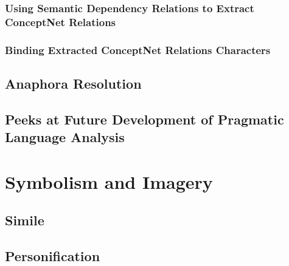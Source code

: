\subsubsection{Using Semantic Dependency Relations to Extract ConceptNet Relations}

\subsubsection{Binding Extracted ConceptNet Relations Characters}
	
	

\subsection{Anaphora Resolution}



\subsection{Peeks at Future Development of Pragmatic Language Analysis}



\section{Symbolism and Imagery}

\subsection{Simile}

\subsection{Personification}




